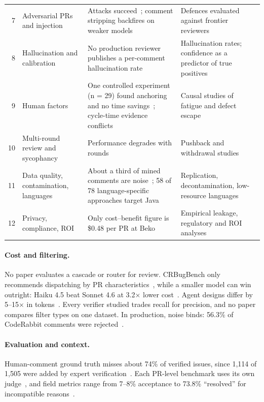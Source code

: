 \begin{table}[t]
\begin{tabularx}{\textwidth}{@{}r>{\raggedright\arraybackslash}p{2.6cm}>{\raggedright\arraybackslash}X>{\raggedright\arraybackslash}X@{}}
7 & Adversarial PRs and injection & Attacks succeed~\cite{alexopoulos2026when}; comment stripping backfires on weaker models~\cite{thornton2026can} & Defences evaluated against frontier reviewers \\
8 & Hallucination and calibration & No production reviewer publishes a per-comment hallucination rate~\cite{tantithamthavorn2026hallujudge} & Hallucination rates; confidence as a predictor of true positives \\
9 & Human factors & One controlled experiment (n = 29) found anchoring and no time savings~\cite{tufano2025deep}; cycle-time evidence conflicts~\cite{tantithamthavorn2026rovodev,cihan2025automated} & Causal studies of fatigue and defect escape \\
10 & Multi-round review and sycophancy & Performance degrades with rounds~\cite{zheng2026from} & Pushback and withdrawal studies \\
11 & Data quality, contamination, languages & About a third of mined comments are noise~\cite{liu2025too}; 58 of 78 language-specific approaches target Java~\cite{tufano2025automating} & Replication, decontamination, low-resource languages \\
12 & Privacy, compliance, ROI & Only cost--benefit figure is \$0.48 per PR at Beko~\cite{cihan2025automated} & Empirical leakage, regulatory and ROI analyses \\
\bottomrule
\end{tabularx}
\end{table}

\paragraph{Cost and filtering.}
No paper evaluates a cascade or router for review. CRBugBench only recommends dispatching by PR characteristics~\cite{yang2026when}, while a smaller model can win outright: Haiku 4.5 beat Sonnet 4.6 at 3.2$\times$ lower cost~\cite{kumar2026bigger}. Agent designs differ by 5--15$\times$ in tokens~\cite{li2026opencodereview}. Every verifier studied trades recall for precision, and no paper compares filter types on one dataset. In production, noise binds: 56.3\% of CodeRabbit comments were rejected~\cite{lin2026agentic}.

\paragraph{Evaluation and context.}
Human-comment ground truth misses about 74\% of verified issues, since 1,114 of 1,505 were added by expert verification~\cite{zhang2026aacr}. Each PR-level benchmark uses its own judge~\cite{zeng2025swr,kumar2026swe,zhang2026aacr}, and field metrics range from 7--8\% acceptance to 73.8\% ``resolved'' for incompatible reasons~\cite{cihan2025automated}.


